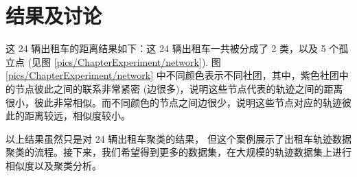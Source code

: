 \section{结果及讨论}
这 24 辆出租车的距离结果如下：这 24 辆出租车一共被分成了 2 类，以及 5 个孤立点 (见图 \ref{pics/ChapterExperiment/network}). 图 \ref{pics/ChapterExperiment/network} 中不同颜色表示不同社团，其中，紫色社团中的节点彼此之间的联系非常紧密 (边很多)，说明这些节点代表的轨迹之间的距离很小，彼此非常相似。而不同颜色的节点之间边很少，说明这些节点对应的轨迹彼此的距离较远，相似度较小。


以上结果虽然只是对 24 辆出租车聚类的结果， 但这个案例展示了出租车轨迹数据聚类的流程。接下来，我们希望得到更多的数据集，在大规模的轨迹数据集上进行相似度以及聚类分析。







